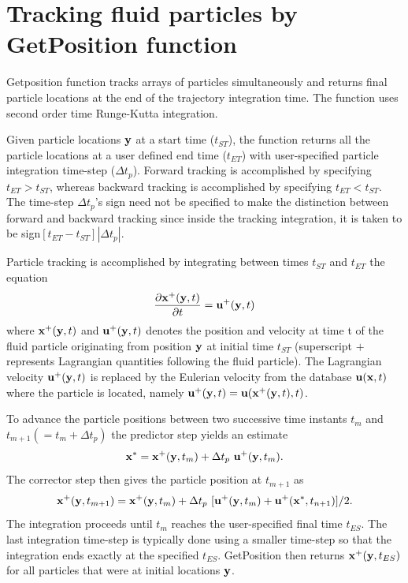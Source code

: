 \documentclass[11pt]{article}
\begin{document}
\section{Tracking fluid particles by GetPosition function}

Getposition function  tracks arrays of particles  simultaneously and returns final particle locations at the end of the trajectory integration time. The function uses second order time Runge-Kutta integration.

Given particle locations ${\bf y}$ at a start time ($t_{ST}$), the function returns all the particle locations at a user defined end time ($t_{ET}$) with user-specified particle integration time-step ($\Delta t_p$). Forward tracking is accomplished by specifying $t_{ET}>t_{ST}$, whereas backward tracking is accomplished by specifying  $t_{ET}<t_{ST}$. The time-step $\Delta t_p$'s sign need not be specified to make the distinction between forward and backward tracking since inside the tracking integration, it is taken to be sign$[t_{ET}-t_{ST}] |\Delta t_p|$. 
   
Particle tracking is accomplished by integrating between times $t_{ST}$ and $t_{ET}$ the equation
\begin{equation}
\frac{\partial {\bf  x}^+({\bf y},t)}{\partial t}={\bf u}^+({\bf y},t)
\label{eq:particlemotionequation}
\end{equation}
where ${\bf x}^+({\bf y},t)$ and ${\bf u}^+({\bf y},t)$ denotes the position and velocity at time t of the fluid particle originating from position ${\bf y}$ at initial time $t_{ST}$ (superscript $+$ represents Lagrangian quantities following the fluid particle).  
The  Lagrangian velocity ${\bf u}^+({\bf y},t)$ is replaced by the Eulerian velocity from the database ${\bf u}({\bf x},t)$ where the particle is located, namely ${\bf u}^+({\bf y},t)={\bf u}({\bf x}^+({\bf y},t),t)$.

To advance the particle positions between two successive time instants $t_m$ and $t_{m+1}(=t_m+\Delta t_p)$   the predictor step yields an estimate
\begin{equation}
{\bf x}^*={\bf x}^+({\bf y},t_m) + \Delta t_p ~{\bf u}^+({\bf y},t_m).
\label{eq:pre_position}
\end{equation}
The corrector step then gives the particle position at $t_{m+1}$ as
\begin{equation}
{\bf x}^+({\bf y},t_{m+1})={\bf x}^+({\bf y},t_m)+\Delta t_p ~[{\bf u}^+({\bf y},t_m)+{\bf u}^+({\bf x}^*,t_{n+1})]/2.
\label{eq:position}
\end{equation}
The integration proceeds until $t_m$ reaches the user-specified final time $t_{ES}$. The last integration time-step is typically done using a smaller time-step so that the integration ends exactly at the specified $t_{ES}$. GetPosition then returns ${\bf x}^+({\bf y},t_{ES})$ for all particles that were at initial locations ${\bf y}$.
\end{document}
